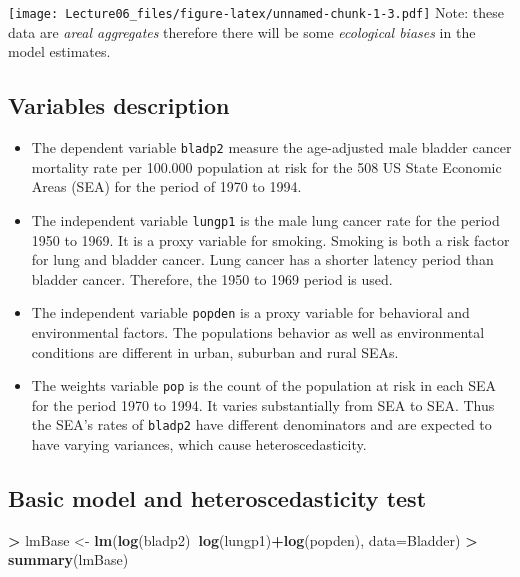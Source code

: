 \documentclass[
]{article}
\newenvironment{Shaded}{\begin{snugshade}}{\end{snugshade}}
\newcommand{\DataTypeTok}[1]{\textcolor[rgb]{0.13,0.29,0.53}{#1}}
\newcommand{\KeywordTok}[1]{\textcolor[rgb]{0.13,0.29,0.53}{\textbf{#1}}}
\newcommand{\NormalTok}[1]{#1}
\newcommand{\OperatorTok}[1]{\textcolor[rgb]{0.81,0.36,0.00}{\textbf{#1}}}
\newcommand{\StringTok}[1]{\textcolor[rgb]{0.31,0.60,0.02}{#1}}
\begin{document}
\texttt{[image: Lecture06\_files/figure-latex/unnamed-chunk-1-3.pdf]}
Note: these data are \emph{areal aggregates} therefore there will be
some \emph{ecological biases} in the model estimates.

\hypertarget{variables-description}{%
\subsection{Variables description}\label{variables-description}}

\begin{itemize}
\item
  The dependent variable \texttt{bladp2} measure the age-adjusted male
  bladder cancer mortality rate per 100.000 population at risk for the
  508 US State Economic Areas (SEA) for the period of 1970 to 1994.
\item
  The independent variable \texttt{lungp1} is the male lung cancer rate
  for the period 1950 to 1969. It is a proxy variable for smoking.
  Smoking is both a risk factor for lung and bladder cancer. Lung cancer
  has a shorter latency period than bladder cancer. Therefore, the 1950
  to 1969 period is used.
\item
  The independent variable \texttt{popden} is a proxy variable for
  behavioral and environmental factors. The populations behavior as well
  as environmental conditions are different in urban, suburban and rural
  SEAs.
\item
  The weights variable \texttt{pop} is the count of the population at
  risk in each SEA for the period 1970 to 1994. It varies substantially
  from SEA to SEA. Thus the SEA's rates of \texttt{bladp2} have
  different denominators and are expected to have varying variances,
  which cause heteroscedasticity.
\end{itemize}

\hypertarget{basic-model-and-heteroscedasticity-test}{%
\subsection{Basic model and heteroscedasticity
test}\label{basic-model-and-heteroscedasticity-test}}

\begin{Shaded}
\begin{Highlighting}[]
\OperatorTok{>}\StringTok{ }\NormalTok{lmBase <-}\StringTok{ }\KeywordTok{lm}\NormalTok{(}\KeywordTok{log}\NormalTok{(bladp2)}\OperatorTok{~}\KeywordTok{log}\NormalTok{(lungp1)}\OperatorTok{+}\KeywordTok{log}\NormalTok{(popden), }\DataTypeTok{data=}\NormalTok{Bladder)}
\OperatorTok{>}\StringTok{ }\KeywordTok{summary}\NormalTok{(lmBase)}
\end{Highlighting}
\end{Shaded}
\end{document}

